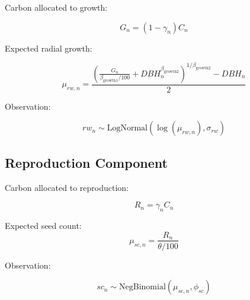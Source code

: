 \documentclass[11pt]{article}
\begin{document}
Carbon allocated to growth:

\[
G_n = (1 - \gamma_n) C_n
\]

Expected radial growth:

\[
\mu_{rw,n} =
\frac{
\left(
\frac{G_n}{\beta_{\text{growth1}}/100} + DBH_n^{\beta_{\text{growth2}}}\right)^{1/\beta_{\text{growth2}}} - DBH_n}{2}
\]

Observation:

\[
rw_n \sim \text{LogNormal}
\left(
\log(\mu_{rw,n}), \sigma_{rw}
\right)
\]

\subsection*{Reproduction Component}

Carbon allocated to reproduction:

\[
R_n = \gamma_n C_n
\]

Expected seed count:
\[
\mu_{sc,n} =\frac{R_n}{\theta/100}
\]

Observation:

\[
sc_n \sim
\text{NegBinomial}
\left(
\mu_{sc,n}, \phi_{sc}
\right)
\]
\end{document}
